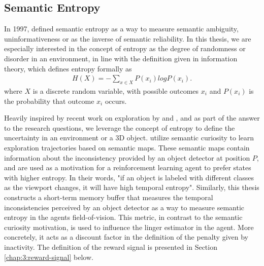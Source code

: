 \subsection{Semantic Entropy}\label{chap:3:semantic-entropy}
In 1997, \textcite{melamed1997measuring} defined semantic entropy as a way to measure semantic ambiguity, uninformativeness or as the inverse of semantic reliability. In this thesis, we are especially interested in the concept of entropy as the degree of randomness or disorder in an environment, in line with the definition given in information theory, which defines entropy formally as
\begin{align*}
    H(X) = - \sum_{x\in X} P(x_i) log P(x_i).
\end{align*}
where $X$ is a discrete random variable, with possible outcomes $x_i$ and $P(x_i)$ is the probability that outcome $x_i$ occurs.

Heavily inspired by recent work on exploration by \textcite{chen2019learning} and  \textcite{chaplot2020semantic}, and as part of the answer to the research questions, we leverage the concept of entropy to define the uncertainty in an environment or a 3D object. \textcite{chaplot2020semantic} utilize semantic curiosity to learn exploration trajectories based on semantic maps. These semantic maps contain information about the inconsistency provided by an object detector at position $P$, and are used as a motivation for a reinforcement learning agent to prefer states with higher entropy. In their words, "if an object is labeled with different classes as the viewport changes, it will have high temporal entropy". Similarly, this thesis constructs a short-term memory buffer that measures the temporal inconsistencies perceived by an object detector as a way to measure semantic entropy in the agents field-of-vision. This metric, in contrast to the semantic curiosity motivation, is used to influence the linger estimator in the agent. More concretely, it acts as a discount factor in the definition of the penalty given by inactivity. The definition of the reward signal is presented in Section \ref{chap:3:reward-signal} below.









